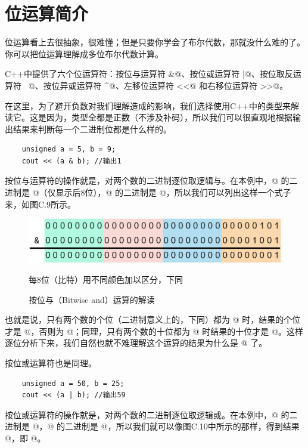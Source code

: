 \section{位运算简介}
位运算看上去很抽象，很难懂；但是只要你学会了布尔代数，那就没什么难的了。你可以把位运算理解成多位布尔代数计算。\par
C++中提供了六个位运算符：按位与运算符 \lstinline@&@、按位或运算符 \lstinline@|@、按位取反运算符 \lstinline@~@、按位异或运算符 \lstinline@^@、左移位运算符 \lstinline@<<@ 和右移位运算符 \lstinline@>>@。\par
在这里，为了避开负数对我们理解造成的影响，我们选择使用C++中的\newline\lstinline@unsigned@ 类型来解读它。这是因为，\lstinline@unsigned@ 类型全都是正数（不涉及补码），所以我们可以很直观地根据输出结果来判断每一个二进制位都是什么样的。\par
\begin{lstlisting}
    unsigned a = 5, b = 9;
    cout << (a & b); //输出1
\end{lstlisting}
按位与运算符的操作就是，对两个数的二进制逐位取逻辑与。在本例中，@ 的二进制是 @（仅显示后8位），@ 的二进制是 @，所以我们可以列出这样一个式子来，如图C.9所示。\par
\begin{figure}[htbp]
    \centering
    \includegraphics[width=.8\textwidth]{../images/other_parts/C_bitwise_and.drawio.png}
    \caption{按位与（Bitwise and）运算的解读}
    \footnotesize{每8位（比特）用不同颜色加以区分，下同}
\end{figure}
也就是说，只有两个数的个位（二进制意义上的，下同）都为 @ 时，结果的个位才是 @，否则为 @；同理，只有两个数的十位都为 @ 时结果的十位才是 @。这样逐位分析下来，我们自然也就不难理解这个运算的结果为什么是 @ 了。\par
按位或运算符也是同理。
\begin{lstlisting}
    unsigned a = 50, b = 25;
    cout << (a | b); //输出59
\end{lstlisting}
按位或运算符的操作就是，对两个数的二进制逐位取逻辑或。在本例中，@ 的二进制是 @，@ 的二进制是 @，所以我们就可以像图C.10中所示的那样，得到结果 @，即 @。
